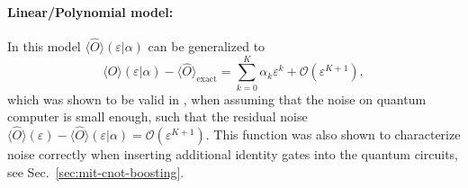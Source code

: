 \paragraph{Linear/Polynomial model:} \label{sec:mit-poly-model}
In this model $\langle \hat{O} \rangle( \varepsilon |\alpha )$ can be generalized to
\begin{equation}
    \label{eq:mit-linear-1}
    \langle \hat{O} \rangle( \varepsilon |\alpha ) -\langle \hat{O} \rangle_{\mathrm{exact}} =\sum ^{K}_{k=0} \alpha _{k} \varepsilon ^{k} + \mathcal{O}(\varepsilon^{K+1}),
\end{equation}
which was shown to be valid in \citet{temmeErrorMitigationShortDepth2017}, when assuming that the noise on quantum computer is small enough, such that the residual noise $\langle \hat{O} \rangle( \varepsilon ) -\langle \hat{O} \rangle( \varepsilon |\alpha ) =\mathcal{O}( \varepsilon ^{K+1})$.
This function was also shown to characterize noise correctly when inserting additional identity gates into the quantum circuits, see Sec.~\ref{sec:mit-cnot-boosting}.

